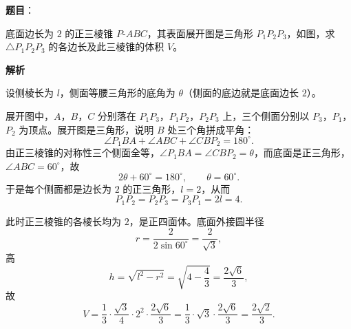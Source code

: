 \begin{answer}

\textbf{题目}：

底面边长为 $2$ 的正三棱锥 $P\text{-}ABC$，其表面展开图是三角形 $P_1P_2P_3$，如图，求 $\triangle P_1P_2P_3$ 的各边长及此三棱锥的体积 $V$。
\nopagebreak[4]
\begin{center}\end{center}
\nopagebreak[4]
\textbf{解析}

设侧棱长为 $l$，侧面等腰三角形的底角为 $\theta$（侧面的底边就是底面边长 $2$）。

展开图中，$A$，$B$，$C$ 分别落在 $P_1P_3$，$P_1P_2$，$P_2P_3$ 上，三个侧面分别以 $P_3$，$P_1$，$P_2$ 为顶点。展开图是三角形，说明 $B$ 处三个角拼成平角：
\nopagebreak[4]
\[\angle P_1BA+\angle ABC+\angle CBP_2=180^\circ .\]
由正三棱锥的对称性三个侧面全等，$\angle P_1BA=\angle CBP_2=\theta$，而底面是正三角形，$\angle ABC=60^\circ$，故
\nopagebreak[4]
\[2\theta+60^\circ=180^\circ,\qquad\theta=60^\circ .\]
于是每个侧面都是边长为 $2$ 的正三角形，$l=2$，从而
\nopagebreak[4]
\[P_1P_2=P_2P_3=P_3P_1=2l=4 .\]

此时正三棱锥的各棱长均为 $2$，是正四面体。底面外接圆半径
\nopagebreak[4]
\[r=\frac{2}{2\sin60^\circ}=\frac{2}{\sqrt3},\]
高
\nopagebreak[4]
\[h=\sqrt{l^2-r^2}=\sqrt{4-\frac43}=\frac{2\sqrt6}{3},\]
故
\nopagebreak[4]
\[V=\frac13\cdot\frac{\sqrt3}{4}\cdot2^2\cdot\frac{2\sqrt6}{3}=\frac13\cdot\sqrt3\cdot\frac{2\sqrt6}{3}=\frac{2\sqrt2}{3} .\]


\end{answer}
